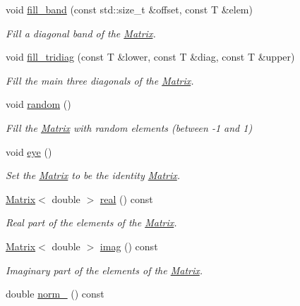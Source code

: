 \begin{DoxyCompactItemize}
void \hyperlink{classLuna_1_1Matrix_a157c952d5a8c60a61f5de8428e2deff0}{fill\+\_\+band} (const std\+::size\+\_\+t \&offset, const T \&elem)
\begin{DoxyCompactList}\small\item\em Fill a diagonal band of the \hyperlink{classLuna_1_1Matrix}{Matrix}. \end{DoxyCompactList}\item 
void \hyperlink{classLuna_1_1Matrix_a428887a193abc1acfe0b0c39070f7942}{fill\+\_\+tridiag} (const T \&lower, const T \&diag, const T \&upper)
\begin{DoxyCompactList}\small\item\em Fill the main three diagonals of the \hyperlink{classLuna_1_1Matrix}{Matrix}. \end{DoxyCompactList}\item 
void \hyperlink{classLuna_1_1Matrix_a6edd17298f4543e51bc0957fcb78c6f0}{random} ()
\begin{DoxyCompactList}\small\item\em Fill the \hyperlink{classLuna_1_1Matrix}{Matrix} with random elements (between -\/1 and 1) \end{DoxyCompactList}\item 
void \hyperlink{classLuna_1_1Matrix_a1b5fc5d3bfd1b03e04def5d314174be6}{eye} ()
\begin{DoxyCompactList}\small\item\em Set the \hyperlink{classLuna_1_1Matrix}{Matrix} to be the identity \hyperlink{classLuna_1_1Matrix}{Matrix}. \end{DoxyCompactList}\item 
\hyperlink{classLuna_1_1Matrix}{Matrix}$<$ double $>$ \hyperlink{classLuna_1_1Matrix_a0cabcec98047a9433948f3d80af436e6}{real} () const
\begin{DoxyCompactList}\small\item\em Real part of the elements of the \hyperlink{classLuna_1_1Matrix}{Matrix}. \end{DoxyCompactList}\item 
\hyperlink{classLuna_1_1Matrix}{Matrix}$<$ double $>$ \hyperlink{classLuna_1_1Matrix_ac6e74a5d4ef4af6e6d574f9c059b5c01}{imag} () const
\begin{DoxyCompactList}\small\item\em Imaginary part of the elements of the \hyperlink{classLuna_1_1Matrix}{Matrix}. \end{DoxyCompactList}\item 
double \hyperlink{classLuna_1_1Matrix_a7a687e4f0eab389331d2ba90f41acdba}{norm\+\_} () const

\end{DoxyCompactItemize}
